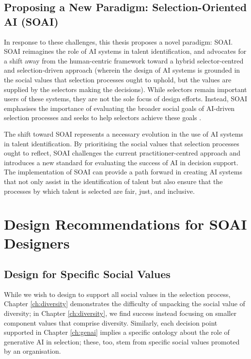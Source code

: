 \subsection{Proposing a New Paradigm: Selection-Oriented AI (SOAI)}
In response to these challenges, this thesis proposes a novel paradigm: SOAI. SOAI reimagines the role of AI systems in talent identification, and advocates for a shift away from the human-centric framework toward a hybrid selector-centred and selection-driven approach (wherein the design of AI systems is grounded in the social values that selection processes ought to uphold, but the values are supplied by the selectors making the decisions). While selectors remain important users of these systems, they are not the sole focus of design efforts. Instead, SOAI emphasises the importance of evaluating the broader social goals of AI-driven selection processes and seeks to help selectors achieve these goals \cite{batyavalue}.

The shift toward SOAI represents a necessary evolution in the use of AI systems in talent identification. By prioritising the social values that selection processes ought to reflect, SOAI challenges the current practitioner-centred approach and introduces a new standard for evaluating the success of AI in decision support. The implementation of SOAI can provide a path forward in creating AI systems that not only assist in the identification of talent but also ensure that the processes by which talent is selected are fair, just, and inclusive.

\section{Design Recommendations for SOAI Designers}
\subsection{Design for Specific Social Values}
While we wish to design to support all social values in the selection process, Chapter \ref{ch:diversity} demonstrates the difficulty of unpacking the social value of diversity; in Chapter \ref{ch:diversity}, we find success instead focusing on smaller component values that comprise diversity. Similarly, each decision point supported in Chapter \ref{ch:genai} implies a specific ontology about the role of generative AI in selection; these, too, stem from specific social values promoted by an organisation.

